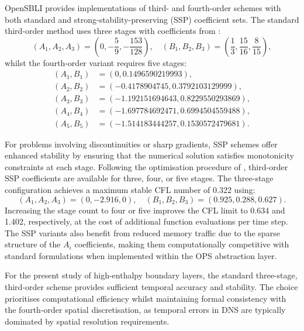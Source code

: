OpenSBLI provides implementations of third- and fourth-order schemes with both standard and strong-stability-preserving (SSP) coefficient sets. The standard third-order method uses three stages with coefficients from \cite{CarpenterKennedy1994}:
\begin{equation}
    (A_1, A_2, A_3) = \left(0, -\frac{5}{9}, -\frac{153}{128}\right), \quad (B_1, B_2, B_3) = \left(\frac{1}{3}, \frac{15}{16}, \frac{8}{15}\right),
\end{equation}
whilst the fourth-order variant requires five stages:
\begin{equation*}
\begin{aligned}
    (A_1, B_1) &= (0, 0.1496590219993), \\
    (A_2, B_2) &= (-0.4178904745, 0.3792103129999), \\
    (A_3, B_3) &= (-1.192151694643, 0.8229550293869), \\
    (A_4, B_4) &= (-1.697784692471, 0.6994504559488), \\
    (A_5, B_5) &= (-1.514183444257, 0.1530572479681).
\end{aligned}
\end{equation*}

For problems involving discontinuities or sharp gradients, SSP schemes offer enhanced stability by ensuring that the numerical solution satisfies monotonicity constraints at each stage. Following the optimisation procedure of \cite{GottliebShu1998}, third-order SSP coefficients are available for three, four, or five stages. The three-stage configuration achieves a maximum stable \gls{CFL} number of 0.322 using:
\begin{equation}
    (A_1, A_2, A_3) = (0, -2.916, 0), \quad (B_1, B_2, B_3) = (0.925, 0.288, 0.627).
\end{equation}
Increasing the stage count to four or five improves the \gls{CFL} limit to 0.634 and 1.402, respectively, at the cost of additional function evaluations per time step. The SSP variants also benefit from reduced memory traffic due to the sparse structure of the $A_i$ coefficients, making them computationally competitive with standard formulations when implemented within the OPS abstraction layer.

For the present study of high-enthalpy boundary layers, the standard three-stage, third-order scheme provides sufficient temporal accuracy and stability. The choice prioritises computational efficiency whilst maintaining formal consistency with the fourth-order spatial discretisation, as temporal errors in DNS are typically dominated by spatial resolution requirements.

